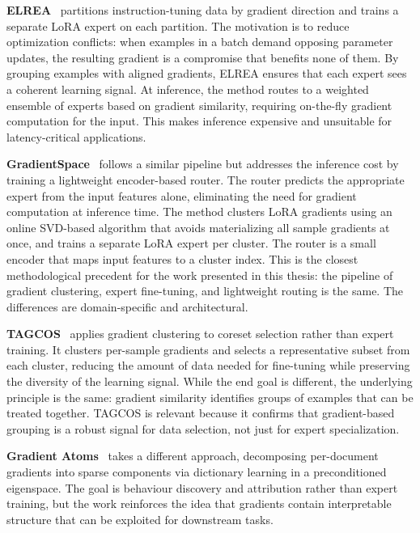 \textbf{ELREA}~\cite{li2025elrea} partitions instruction-tuning data by gradient direction and trains a separate LoRA expert on each partition. The motivation is to reduce optimization conflicts: when examples in a batch demand opposing parameter updates, the resulting gradient is a compromise that benefits none of them. By grouping examples with aligned gradients, ELREA ensures that each expert sees a coherent learning signal. At inference, the method routes to a weighted ensemble of experts based on gradient similarity, requiring on-the-fly gradient computation for the input. This makes inference expensive and unsuitable for latency-critical applications.

\textbf{GradientSpace}~\cite{sridharan2025gradientspace} follows a similar pipeline but addresses the inference cost by training a lightweight encoder-based router. The router predicts the appropriate expert from the input features alone, eliminating the need for gradient computation at inference time. The method clusters LoRA gradients using an online SVD-based algorithm that avoids materializing all sample gradients at once, and trains a separate LoRA expert per cluster. The router is a small encoder that maps input features to a cluster index. This is the closest methodological precedent for the work presented in this thesis: the pipeline of gradient clustering, expert fine-tuning, and lightweight routing is the same. The differences are domain-specific and architectural.

\textbf{TAGCOS}~\cite{zhang2024tagcos} applies gradient clustering to coreset selection rather than expert training. It clusters per-sample gradients and selects a representative subset from each cluster, reducing the amount of data needed for fine-tuning while preserving the diversity of the learning signal. While the end goal is different, the underlying principle is the same: gradient similarity identifies groups of examples that can be treated together. TAGCOS is relevant because it confirms that gradient-based grouping is a robust signal for data selection, not just for expert specialization.

\textbf{Gradient Atoms}~\cite{rosser2026gradientatoms} takes a different approach, decomposing per-document gradients into sparse components via dictionary learning in a preconditioned eigenspace. The goal is behaviour discovery and attribution rather than expert training, but the work reinforces the idea that gradients contain interpretable structure that can be exploited for downstream tasks.

